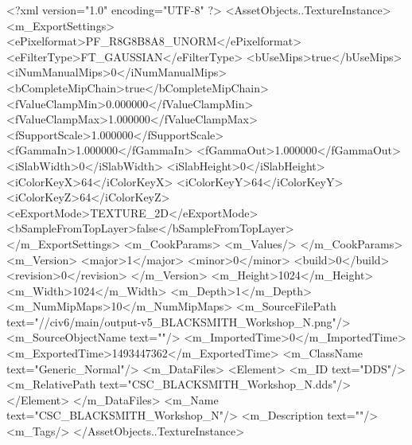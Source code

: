 <?xml version="1.0" encoding="UTF-8" ?>
<AssetObjects..TextureInstance>
	<m_ExportSettings>
		<ePixelformat>PF_R8G8B8A8_UNORM</ePixelformat>
		<eFilterType>FT_GAUSSIAN</eFilterType>
		<bUseMips>true</bUseMips>
		<iNumManualMips>0</iNumManualMips>
		<bCompleteMipChain>true</bCompleteMipChain>
		<fValueClampMin>0.000000</fValueClampMin>
		<fValueClampMax>1.000000</fValueClampMax>
		<fSupportScale>1.000000</fSupportScale>
		<fGammaIn>1.000000</fGammaIn>
		<fGammaOut>1.000000</fGammaOut>
		<iSlabWidth>0</iSlabWidth>
		<iSlabHeight>0</iSlabHeight>
		<iColorKeyX>64</iColorKeyX>
		<iColorKeyY>64</iColorKeyY>
		<iColorKeyZ>64</iColorKeyZ>
		<eExportMode>TEXTURE_2D</eExportMode>
		<bSampleFromTopLayer>false</bSampleFromTopLayer>
	</m_ExportSettings>
	<m_CookParams>
		<m_Values/>
	</m_CookParams>
	<m_Version>
		<major>1</major>
		<minor>0</minor>
		<build>0</build>
		<revision>0</revision>
	</m_Version>
	<m_Height>1024</m_Height>
	<m_Width>1024</m_Width>
	<m_Depth>1</m_Depth>
	<m_NumMipMaps>10</m_NumMipMaps>
	<m_SourceFilePath text="//civ6/main/output\blacksmith-v5\Textures\CSC_BLACKSMITH_Workshop_N.png"/>
	<m_SourceObjectName text=""/>
	<m_ImportedTime>0</m_ImportedTime>
	<m_ExportedTime>1493447362</m_ExportedTime>
	<m_ClassName text="Generic_Normal"/>
	<m_DataFiles>
		<Element>
			<m_ID text="DDS"/>
			<m_RelativePath text="CSC_BLACKSMITH_Workshop_N.dds"/>
		</Element>
	</m_DataFiles>
	<m_Name text="CSC_BLACKSMITH_Workshop_N"/>
	<m_Description text=""/>
	<m_Tags/>
</AssetObjects..TextureInstance>

